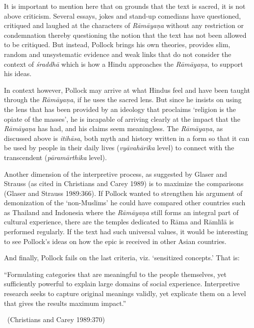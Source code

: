 It is important to mention here that on grounds that the text is sacred, it is not above criticism. Several essays, jokes and stand-up comedians have questioned, critiqued and laughed at the characters of \textit{Rāmāyaṇa} without any restriction or condemnation thereby questioning the notion that the text has not been allowed to be critiqued. But instead, Pollock brings his own theories, provides slim, random and unsystematic evidence and weak links that do not consider the context of \textit{śraddhā} which is how a Hindu approaches the \textit{Rāmāyaṇa}, to support his ideas.

In context however, Pollock may arrive at what Hindus feel and have been taught through the \textit{Rāmāyaṇa}, if he uses the sacred lens. But since he insists on using the lens that has been provided by an ideology that proclaims ‘religion is the opiate of the masses’, he is incapable of arriving clearly at the impact that the \textit{Rāmāyaṇa} has had, and his claims seem meaningless. The \textit{Rāmāyaṇa}, as discussed above is \textit{itihāsa}, both myth and history written in a form so that it can be used by people in their daily lives (\textit{vyāvahārika} level) to connect with the transcendent (\textit{pāramārthika} level).

Another dimension of the interpretive process, as suggested by Glaser and Strauss (as cited in Christians and Carey 1989) is to maximize the comparisons (Glaser and Strauss 1989:366). If Pollock wanted to strengthen his argument of demonization of the ‘non-Muslims’ he could have compared other countries such as Thailand and Indonesia where the \textit{Rāmāyaṇa} still forms an integral part of cultural experience, there are the temples dedicated to Rāma and Rāmlīlā is performed regularly. If the text had such universal values, it would be interesting to see Pollock’s ideas on how the epic is received in other Asian countries.

And finally, Pollock fails on the last criteria, viz. ‘sensitized concepts.’ That is:

\begin{myquote}
“Formulating categories that are meaningful to the people themselves, yet sufficiently powerful to explain large domains of social experience. Interpretive research seeks to capture original meanings validly, yet explicate them on a level that gives the results maximum impact.” 

~\hfill (Christians and Carey 1989:370)
\end{myquote}

